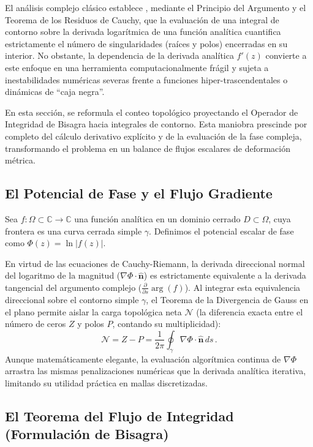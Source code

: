 \documentclass[11pt]{article}
\begin{document}
El análisis complejo clásico establece \cite{ahlfors1979complex}, mediante el Principio del Argumento y el Teorema de los Residuos de Cauchy, que la evaluación de una integral de contorno sobre la derivada logarítmica de una función analítica cuantifica estrictamente el número de singularidades (raíces y polos) encerradas en su interior. No obstante, la dependencia de la derivada analítica $f'(z)$ convierte a este enfoque en una herramienta computacionalmente frágil y sujeta a inestabilidades numéricas severas frente a funciones hiper-trascendentales o dinámicas de ``caja negra''.

En esta sección, se reformula el conteo topológico proyectando el Operador de Integridad de Bisagra hacia integrales de contorno. Esta maniobra prescinde por completo del cálculo derivativo explícito y de la evaluación de la fase compleja, transformando el problema en un balance de flujos escalares de deformación métrica.

\subsection{El Potencial de Fase y el Flujo Gradiente}

Sea $f: \Omega \subset \mathbb{C} \to \mathbb{C}$ una función analítica en un dominio cerrado $D \subset \Omega$, cuya frontera es una curva cerrada simple $\gamma$. Definimos el potencial escalar de fase como $\Phi(z) = \ln|f(z)|$.

En virtud de las ecuaciones de Cauchy-Riemann, la derivada direccional normal del logaritmo de la magnitud ($\nabla \Phi \cdot \mathbf{\hat{n}}$) es estrictamente equivalente a la derivada tangencial del argumento complejo ($\frac{\partial}{\partial s} \arg(f)$). Al integrar esta equivalencia direccional sobre el contorno simple $\gamma$, el Teorema de la Divergencia de Gauss en el plano \cite{marsden2003vector} permite aislar la carga topológica neta $\mathcal{N}$ (la diferencia exacta entre el número de ceros $Z$ y polos $P$, contando su multiplicidad):
\begin{equation}
    \label{eq:teorema_divergencia}
    \mathcal{N} = Z - P = \frac{1}{2\pi} \oint_{\gamma} \nabla \Phi \cdot \mathbf{\hat{n}} \, ds \,.
\end{equation}
Aunque matemáticamente elegante, la evaluación algorítmica continua de $\nabla \Phi$ arrastra las mismas penalizaciones numéricas que la derivada analítica iterativa, limitando su utilidad práctica en mallas discretizadas.

\subsection{El Teorema del Flujo de Integridad (Formulación de Bisagra)}
\end{document}
